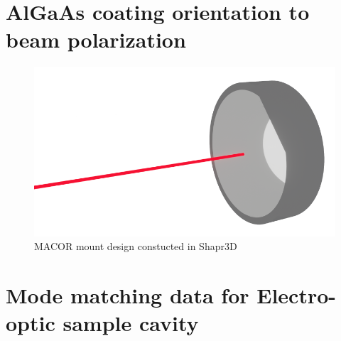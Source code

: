 
\section{AlGaAs coating orientation to beam polarization}

\begin{figure}[H]
\includegraphics[width=\textwidth]{figs/ALGAAS/laser_mirror_test2.png}
\caption{MACOR mount design constucted in Shapr3D}
\label{fig:macor_mount_design}
\end{figure}


\section{Mode matching data for Electro-optic sample cavity}

